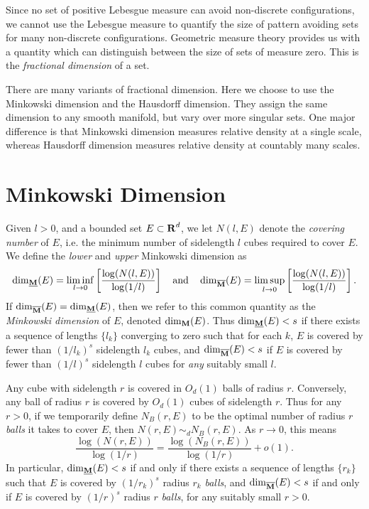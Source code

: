 
Since no set of positive Lebesgue measure can avoid non-discrete configurations, we cannot use the Lebesgue measure to quantify the size of pattern avoiding sets for many non-discrete configurations. Geometric measure theory provides us with a quantity which can distinguish between the size of sets of measure zero. This is the \emph{fractional dimension} of a set.

There are many variants of fractional dimension. Here we choose to use the Minkowski dimension and the Hausdorff dimension. They assign the same dimension to any smooth manifold, but vary over more singular sets. One major difference is that Minkowski dimension measures relative density at a single scale, whereas Hausdorff dimension measures relative density at countably many scales.









\section{Minkowski Dimension}

Given $l > 0$, and a bounded set $E \subset \operatorname{\mathbf{R}}^d$, we let $N(l,E)$ denote the \emph{covering number} of $E$, i.e. the minimum number of sidelength $l$ cubes required to cover $E$. We define the \emph{lower} and \emph{upper} Minkowski dimension as
%
\[ \operatorname{\dim_{\underline{\mathbf{M}}}}(E) = \liminf_{l \to 0} \left[ \frac{\log(N(l,E))}{\log(1/l)} \right] \quad\text{and}\quad \operatorname{\dim_{\overline{\mathbf{M}}}}(E) = \limsup_{l \to 0} \left[ \frac{\log(N(l,E))}{\log(1/l)} \right]. \]
%
If $\operatorname{\dim_{\overline{\mathbf{M}}}}(E) = \operatorname{\dim_{\underline{\mathbf{M}}}}(E)$, then we refer to this common quantity as the \emph{Minkowski dimension} of $E$, denoted $\operatorname{\dim_{\mathbf{M}}}(E)$. Thus $\operatorname{\dim_{\underline{\mathbf{M}}}}(E) < s$ if there exists a sequence of lengths $\{ l_k \}$ converging to zero such that for each $k$, $E$ is covered by fewer than $(1/l_k)^s$ sidelength $l_k$ cubes, and $\operatorname{\dim_{\overline{\mathbf{M}}}}(E) < s$ if $E$ is covered by fewer than $(1/l)^s$ sidelength $l$ cubes for \emph{any} suitably small $l$.

\begin{remark}
	Any cube with sidelength $r$ is covered in $O_d(1)$ balls of radius $r$. Conversely, any ball of radius $r$ is covered by $O_d(1)$ cubes of sidelength $r$. Thus for any $r > 0$, if we temporarily define $N_B(r,E)$ to be the optimal number of radius $r$ \emph{balls} it takes to cover $E$, then $N(r,E) \sim_d N_B(r,E)$. As $r \to 0$, this means
	\[ \frac{\log(N(r,E))}{\log(1/r)} = \frac{\log(N_B(r,E))}{\log(1/r)} + o(1). \]
	In particular, $\operatorname{\dim_{\underline{\mathbf{M}}}}(E) < s$ if and only if there exists a sequence of lengths $\{ r_k \}$ such that $E$ is covered by $(1/r_k)^s$ radius $r_k$ \emph{balls}, and $\operatorname{\dim_{\overline{\mathbf{M}}}}(E) < s$ if and only if $E$ is covered by $(1/r)^s$ radius $r$ \emph{balls}, for any suitably small $r > 0$.
\end{remark}

